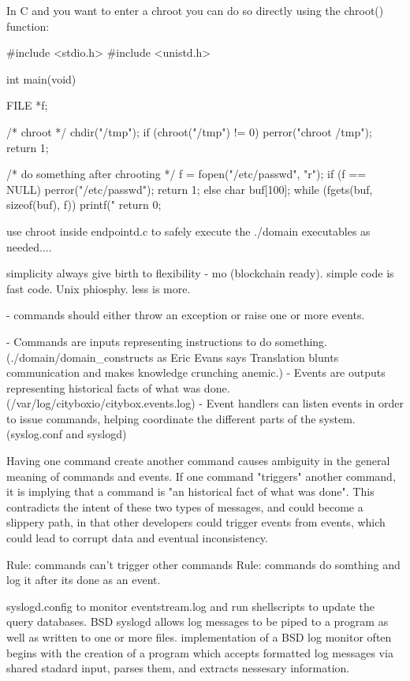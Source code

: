 
In C and you want to enter a chroot you can do so directly using the chroot() function:

#include <stdio.h>
#include <unistd.h>

int main(void) {
     FILE *f;

     /* chroot */
     chdir("/tmp");
     if (chroot("/tmp") != 0) {
         perror("chroot /tmp");
         return 1;
     }

     /* do something after chrooting */
     f = fopen("/etc/passwd", "r");
     if (f == NULL) {
         perror("/etc/passwd");
         return 1;
     } else {
         char buf[100];
         while (fgets(buf, sizeof(buf), f)) {
              printf("%
         }
     }
     return 0;
}

use chroot inside endpointd.c to safely execute the ./domain executables as needed....

 

simplicity always give birth to flexibility - mo (blockchain ready). simple code is fast code. Unix phiosphy. less is more.

- commands should either throw an exception or raise one or more events.


- Commands are inputs representing instructions to do something.(./domain/domain_constructs as Eric Evans says Translation blunts communication and makes knowledge crunching anemic.)
- Events are outputs representing historical facts of what was done. (/var/log/cityboxio/citybox.events.log)
- Event handlers can listen events in order to issue commands, helping coordinate the different parts of the system. (syslog.conf and syslogd)


Having one command create another command causes ambiguity in the general meaning of commands and events.
If one command "triggers" another command, it is implying that a command is "an historical fact of what was done". This contradicts the intent of these two types of messages, and could become a slippery path, in that other developers could trigger events from events, which could lead to corrupt data and eventual inconsistency.

Rule: commands can't trigger other commands
Rule: commands do somthing and log it after its done as an event.


syslogd.config to monitor eventstream.log and run shellscripts to update the query databases.
BSD syslogd allows log messages to be piped to a program as well as written to one or more files.
implementation of a BSD log monitor often begins with the creation of a program which accepts formatted log messages via
shared stadard input, parses them, and extracts nessesary information.

